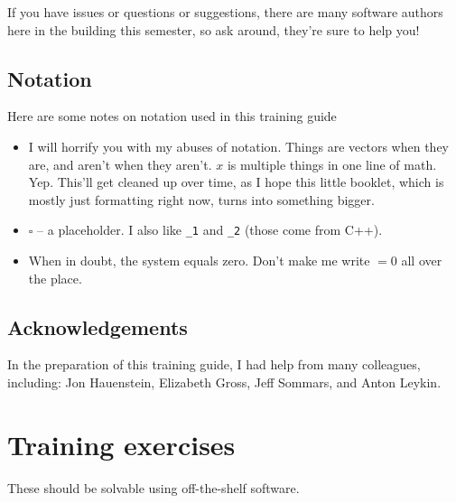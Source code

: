 \documentclass[letter,portrait]{article}
\newcommand{\1}{{\tt \_1}}
\newcommand{\2}{{\tt \_2}}
\begin{document}
If you have issues or questions or suggestions, there are many software authors here in the building this semester, so ask around, they're sure to help you!



\subsection{Notation}

Here are some notes on notation used in this training guide

\begin{itemize}
\item	I will horrify you with my abuses of notation.  Things are vectors when they are, and aren't when they aren't.  $x$ is multiple things in one line of math.  Yep.  This'll get cleaned up over time, as I hope this little booklet, which is mostly just formatting right now, turns into something bigger.
\item $\square$ -- a placeholder.  I also like \1 and \2 (those come from C++).
\item When in doubt, the system equals zero.  Don't make me write $=0$ all over the place.
\end{itemize}

\subsection{Acknowledgements}

In the preparation of this training guide, I had help from many colleagues, including: Jon Hauenstein, Elizabeth Gross, Jeff Sommars, and Anton Leykin.












\clearpage
\section{Training exercises}

These should be solvable using off-the-shelf software.  
\end{document}
